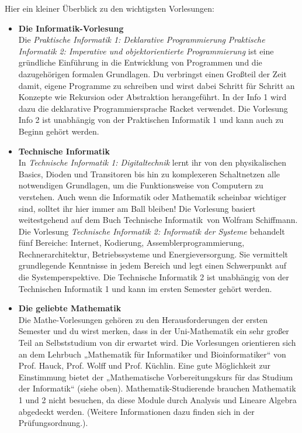 \ifbachelor
{}
Hier ein kleiner Überblick zu den wichtigsten Vorlesungen:
\begin{itemize}
	\item
	\textbf{Die Informatik-Vorlesung} \\
	Die
	\ifwintersemester \emph{Praktische Informatik 1: Deklarative Programmierung} \fi
	\ifsommersemester \emph{Praktische Informatik 2: Imperative und objektorientierte Programmierung} \fi
	ist eine gründliche Einführung in die Entwicklung von Programmen und die dazugehörigen formalen Grundlagen.
	Du verbringst einen Großteil der Zeit damit, eigene Programme zu schreiben und wirst dabei Schritt für Schritt
	an Konzepte wie Rekursion oder Abstraktion herangeführt.
	\ifwintersemester In der Info 1 wird dazu die deklarative Programmiersprache Racket verwendet. \fi
	\ifsommersemester Die Vorlesung Info 2 ist unabhängig von der Praktischen Informatik 1 und kann auch zu Beginn gehört werden. \fi

	\ifinfo
	\item
	\textbf{Technische Informatik} \\
	\ifwintersemester
	In \emph{Technische Informatik 1: Digitaltechnik} lernt ihr von den physikalischen Basics, Dioden und Transitoren bis hin zu komplexeren Schaltnetzen alle notwendigen Grundlagen,
	um die Funktionsweise von Computern zu verstehen. Auch wenn die Informatik oder Mathematik scheinbar wichtiger sind, solltet ihr hier immer am Ball bleiben!
	Die Vorlesung basiert weitestgehend auf dem Buch \glqq Technische Informatik\grqq \ von Wolfram Schiffmann.
	\fi
	\ifsommersemester
	Die Vorlesung \emph{Technische Informatik 2: Informatik der Systeme} behandelt fünf Bereiche: Internet, Kodierung, Assemblerprogrammierung, Rechnerarchitektur, Betriebssysteme
	und Energieversorgung. Sie vermittelt grundlegende Kenntnisse in jedem Bereich und legt einen Schwerpunkt auf die Systemperspektive. Die Technische Informatik 2 ist unabhängig von
	der Technischen Informatik 1 und kann im ersten Semester gehört werden.
	\fi
	\fi

	\item
	\textbf{Die geliebte Mathematik} \\
	Die Mathe-Vorlesungen gehören zu den Herausforderungen der ersten Semester und du wirst merken, dass in der Uni-Mathematik ein sehr großer Teil an Selbststudium von dir erwartet wird.
	Die Vorlesungen orientieren sich an dem Lehrbuch „Mathematik für Informatiker und Bioinformatiker“ von Prof. Hauck, Prof. Wolff und Prof. Küchlin. Eine gute Möglichkeit zur
	Einstimmung bietet der „Mathematische Vorbereitungskurs für das Studium der Informatik“ (siehe oben).
	\iflehramt
	Mathematik-Studierende brauchen Mathematik 1
	und 2 nicht besuchen, da diese Module durch Analysis und Lineare Algebra
	abgedeckt werden. (Weitere Informationen dazu finden sich in der Prüfungsordnung.).
	\fi
\end{itemize}
\fi
